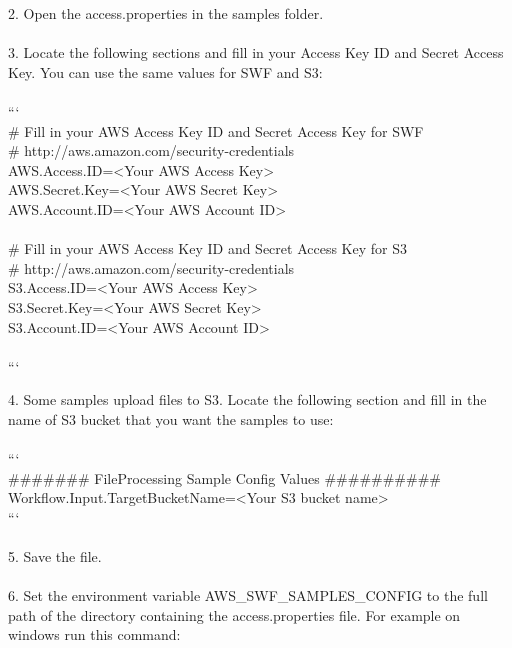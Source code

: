 \documentclass{article}
\begin{document}
\begin{textit}
2.  Open the access.properties in the samples folder. \\ \\

3.  Locate the following sections and fill in your Access Key ID and Secret Access Key. You can use the same values for SWF and S3: \\ \\

    ``` \\
    \# Fill in your AWS Access Key ID and Secret Access Key for SWF \\
    \# http://aws.amazon.com/security-credentials \\
    AWS.Access.ID=<Your AWS Access Key> \\
    AWS.Secret.Key=<Your AWS Secret Key> \\
    AWS.Account.ID=<Your AWS Account ID> \\ \\

    \# Fill in your AWS Access Key ID and Secret Access Key for S3 \\
    \# http://aws.amazon.com/security-credentials \\
    S3.Access.ID=<Your AWS Access Key> \\
    S3.Secret.Key=<Your AWS Secret Key> \\
    S3.Account.ID=<Your AWS Account ID> \\ \\
    ```

4.  Some samples upload files to S3. Locate the following section and fill in the name of S3 bucket that you want the samples to use: \\ \\

     ``` \\
     \#\#\#\#\#\#\# FileProcessing Sample Config Values \#\#\#\#\#\#\#\#\#\# \\
     Workflow.Input.TargetBucketName=<Your S3 bucket name> \\
     ``` \\ \\

5.  Save the file. \\ \\

6.  Set the environment variable AWS\_SWF\_SAMPLES\_CONFIG to the full path of the directory containing the access.properties file. For example on windows run this command: \\ \\


\end{textit}
\end{document}
